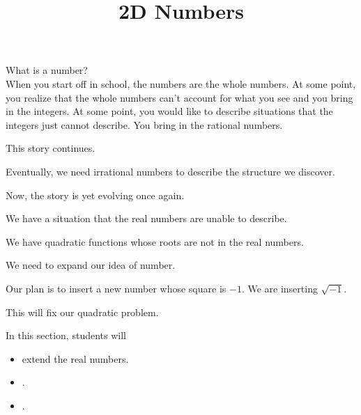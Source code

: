 \documentclass{ximera}
\title{2D Numbers}
\begin{document}
\begin{abstract}
\end{abstract}
\maketitle







What is a number? \\


When you start off in school, the numbers are the whole numbers.  At some point, you realize that the whole numbers can't account for what you see and you bring in the integers.  At some point, you would like to describe situations that the integers just cannot describe.  You bring in the rational numbers. 


This story continues.

Eventually, we need irrational numbers to describe the structure we discover.


Now, the story is yet evolving once again.


\begin{explanation}

We have a situation that the real numbers are unable to describe.


We have quadratic functions whose roots are not in the real numbers.  


We need to expand our idea of number.

\end{explanation}



Our plan is to insert a new number whose square is $-1$.  We are inserting $\sqrt{-1}$.  


This will fix our quadratic problem.










\begin{sectionOutcomes}
In this section, students will 

\begin{itemize}
\item extend the real numbers.
\item .
\item .
\end{itemize}
\end{sectionOutcomes}
\end{document}
